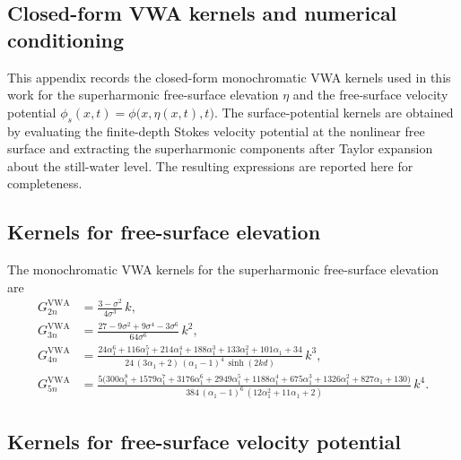 \documentclass[lineno]{JFM-FLM_Au}
\begin{document}
\begin{appen}
\section{Closed-form VWA kernels and numerical conditioning}\label{appC}

This appendix records the closed-form monochromatic VWA kernels used in this work for the
superharmonic free-surface elevation $\eta$ and the free-surface velocity potential
$\phi_s(x,t)=\phi\bigl(x,\eta(x,t),t\bigr)$.
The surface-potential kernels are obtained by evaluating the finite-depth Stokes velocity potential
at the nonlinear free surface and extracting the superharmonic components after Taylor expansion
about the still-water level. The resulting expressions are reported here for completeness.

\subsection{Kernels for free-surface elevation}\label{appC:eta_kernels}

The monochromatic VWA kernels for the superharmonic free-surface elevation are
\begin{subequations}\label{app:VWA_G_kernels}
\begin{align}
G^{\mathrm{VWA}}_{2n}
&= \frac{3-\sigma^2}{4\sigma^3}\,k,
\\[2mm]
G^{\mathrm{VWA}}_{3n}
&= \frac{27-9\sigma^2+9\sigma^4-3\sigma^6}{64\sigma^6}\,k^2,
\\[2mm]
G^{\mathrm{VWA}}_{4n}
&=
\frac{
24\alpha_1^6+116\alpha_1^5+214\alpha_1^4+188\alpha_1^3+133\alpha_1^2+101\alpha_1+34}
{24\,(3\alpha_1+2)\,(\alpha_1-1)^4\,\sinh(2kd)}\,k^3,
\\[2mm]
G^{\mathrm{VWA}}_{5n}
&=
\frac{5\bigl(
300\alpha_1^8+1579\alpha_1^7+3176\alpha_1^6+2949\alpha_1^5+1188\alpha_1^4
+675\alpha_1^3+1326\alpha_1^2+827\alpha_1+130\bigr)}
{384\,(\alpha_1-1)^6\,(12\alpha_1^2+11\alpha_1+2)}\,k^4.
\end{align}
\end{subequations}

\subsection{Kernels for free-surface velocity potential}\label{appC:phis_kernels}


\end{appen}
\end{document}
